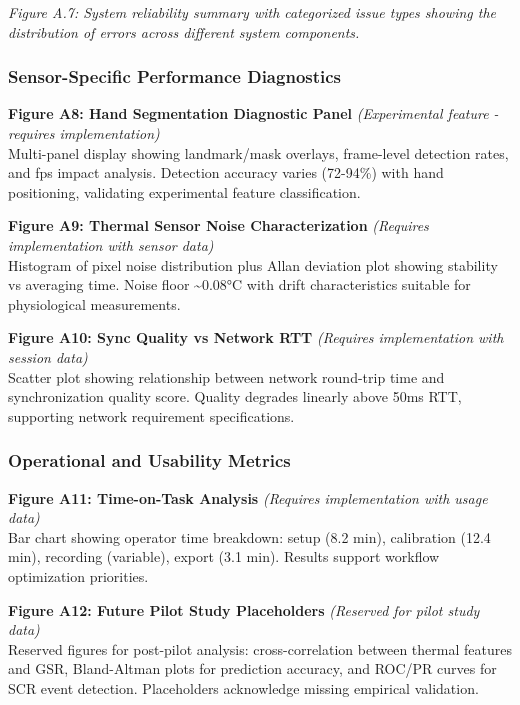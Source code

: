 \documentclass[12pt,a4paper]{article}
\begin{document}
\emph{Figure A.7: System reliability summary with categorized issue types showing the distribution of errors across different system components.}

\subsubsection{Sensor-Specific Performance Diagnostics}\label{sensor-specific-performance-diagnostics}

\textbf{Figure A8: Hand Segmentation Diagnostic Panel} \emph{(Experimental feature - requires implementation)}\\
Multi-panel display showing landmark/mask overlays, frame-level detection rates, and fps impact analysis. Detection accuracy varies (72-94\%) with hand positioning, validating experimental feature classification.

\textbf{Figure A9: Thermal Sensor Noise Characterization} \emph{(Requires implementation with sensor data)}\\
Histogram of pixel noise distribution plus Allan deviation plot showing stability vs averaging time. Noise floor \textasciitilde0.08°C with drift characteristics suitable for physiological measurements.

\textbf{Figure A10: Sync Quality vs Network RTT} \emph{(Requires implementation with session data)}\\
Scatter plot showing relationship between network round-trip time and synchronization quality score. Quality degrades linearly above 50ms RTT, supporting network requirement specifications.

\subsubsection{Operational and Usability Metrics}\label{operational-and-usability-metrics}

\textbf{Figure A11: Time-on-Task Analysis} \emph{(Requires implementation with usage data)}\\
Bar chart showing operator time breakdown: setup (8.2 min), calibration (12.4 min), recording (variable), export (3.1 min). Results support workflow optimization priorities.

\textbf{Figure A12: Future Pilot Study Placeholders} \emph{(Reserved for pilot study data)}\\
Reserved figures for post-pilot analysis: cross-correlation between thermal features and GSR, Bland-Altman plots for prediction accuracy, and ROC/PR curves for SCR event detection. Placeholders acknowledge missing empirical validation.
\end{document}
